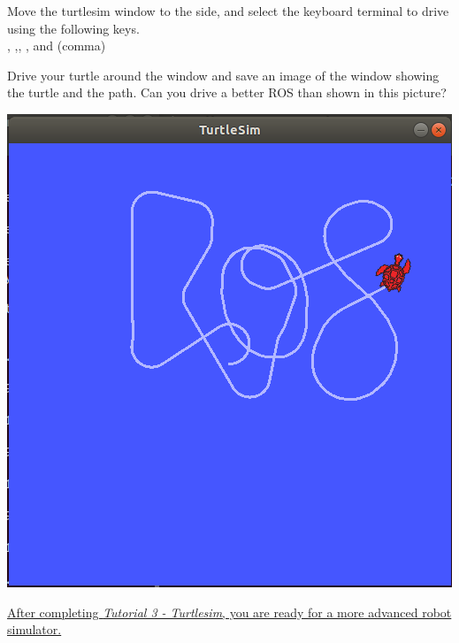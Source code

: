 \documentclass[12pt]{article}
\newcommand{\I}{\raisebox{-0.1em}{I}}
\newcommand{\IKey}{\keystroke{\I}}
\newcommand{\Kay}{\raisebox{-0.1em}{K}}
\newcommand{\KayKey}{\keystroke{\Kay}}
\newcommand{\J}{\raisebox{-0.1em}{J}}
\newcommand{\JKey}{\keystroke{\J}}
\newcommand{\EL}{\raisebox{-0.1em}{L}}
\newcommand{\ELKey}{\keystroke{\EL}}
\newcommand{\COMMA}{\raisebox{-0.1em}{,}}
\newcommand{\COMMAKey}{\keystroke{\COMMA}}
\begin{document}
\begin{description}
\begin{enumerate}
\begin{multicols}{2}

\begin{framed}
Move the turtlesim window to the side, and select the keyboard terminal to drive using the following keys.\vspace{2mm}\\ \IKey, \JKey,\KayKey, \ELKey, and \COMMAKey (comma) \vspace{5mm}

Drive your turtle around the window and save an image of the window showing the turtle and the path. Can you drive a better ROS than shown in this picture? 
\end{framed}

\includegraphics[scale=0.4]{tutorial3_fig1.png}	
\end{multicols}			
			
\end{enumerate}  

\underline{After completing {\it Tutorial 3 - Turtlesim}, you are ready for a more advanced robot simulator.}



\end{description}
\end{document}
